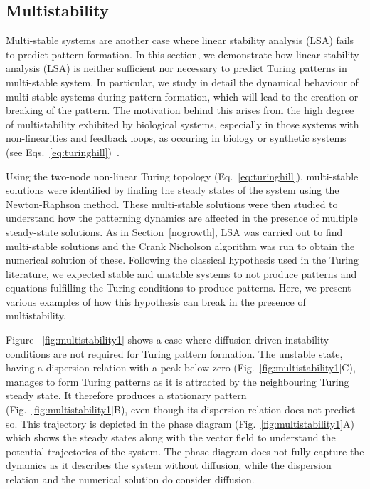 \subsection{Multistability}

Multi-stable systems are another case where linear stability analysis (LSA) fails to predict pattern formation.  In this section, we demonstrate how linear stability analysis (LSA) is neither sufficient 
nor necessary to predict Turing patterns in multi-stable system. In particular, we study in detail the dynamical behaviour of multi-stable systems during pattern formation, which will lead to the creation or breaking of the pattern.
The motivation behind this arises from the high degree of multistability exhibited by biological systems, especially in those systems with non-linearities and feedback loops, as occuring in biology or synthetic systems (see Eqs.~\ref{eq:turinghill})~\parencite{pham2020complexity, leite2009multistability}.

Using the two-node non-linear Turing topology (Eq.~\ref{eq:turinghill}), multi-stable solutions were identified by finding the steady states of the system using the Newton-Raphson method. These multi-stable solutions were then studied to understand how the patterning dynamics are affected in the presence of multiple steady-state solutions.
As in Section~\ref{nogrowth}, LSA was carried out to find multi-stable solutions and the Crank Nicholson algorithm was run to obtain the numerical solution of these.
Following the classical hypothesis used in the Turing literature, we expected stable and unstable systems to not produce patterns and equations fulfilling the Turing conditions to produce patterns.
Here, we present various examples of how this hypothesis can break in the presence of multistability.

Figure ~\ref{fig:multistability1} shows a case where diffusion-driven instability conditions are not required for Turing pattern formation.
The unstable state, having a dispersion relation with a peak below zero (Fig.~\ref{fig:multistability1}C), manages to form Turing patterns as it is attracted by the neighbouring Turing steady state.
It therefore produces a stationary pattern (Fig.~\ref{fig:multistability1}B), even though its dispersion relation does not predict so.
This trajectory is depicted in the phase diagram (Fig.~\ref{fig:multistability1}A) which shows the steady states along with the vector field to understand the potential trajectories of the system.
The phase diagram does not fully capture the dynamics as it describes the system without diffusion, while the dispersion relation and the numerical solution do consider diffusion.

